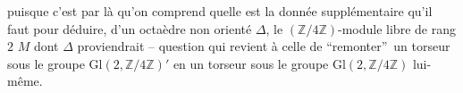 puisque c'est par là qu'on comprend quelle est la donnée supplémentaire qu'il faut pour déduire, d'un octaèdre non orienté $\Delta$, le $(\mathbb Z/4\mathbb Z)$-module libre de rang $2$ $M$ dont $\Delta$ proviendrait -- question qui revient à celle de \textquotedblleft remonter\textquotedblright\ un torseur sous le groupe $\mathrm{Gl}(2,\mathbb Z/4\mathbb Z)'$ en un torseur sous le groupe $\mathrm{Gl}(2,\mathbb Z/4\mathbb Z)$ lui-même.
